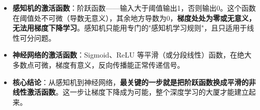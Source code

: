 \documentclass[a4paper,11pt]{ctexart}
\begin{document}
\begin{beginnerbox}
    \begin{itemize}
        \item \textbf{感知机的激活函数}：阶跃函数——输入大于阈值输出1，否则输出0。这个函数在阈值处不可微（导数无意义），其余地方导数为0，\textbf{梯度处处为零或无意义，无法用梯度下降学习}。感知机只能用专门的"感知机学习规则"，且只适用于线性可分问题。
        \item \textbf{神经网络的激活函数}：Sigmoid、ReLU 等平滑（或分段线性）函数，在绝大多数点可微，梯度有意义，反向传播能正常传递信号。
        \item \textbf{核心结论}：从感知机到神经网络，\textbf{最关键的一步就是把阶跃函数换成平滑的非线性激活函数}。这一步让梯度下降成为可能，整个深度学习的大厦才能建立起来。
    \end{itemize}
\end{beginnerbox}
\end{document}
